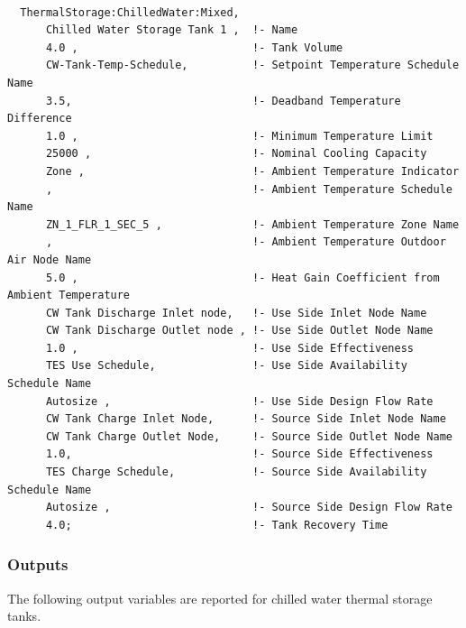 \begin{lstlisting}

  ThermalStorage:ChilledWater:Mixed,
      Chilled Water Storage Tank 1 ,  !- Name
      4.0 ,                           !- Tank Volume
      CW-Tank-Temp-Schedule,          !- Setpoint Temperature Schedule Name
      3.5,                            !- Deadband Temperature Difference
      1.0 ,                           !- Minimum Temperature Limit
      25000 ,                         !- Nominal Cooling Capacity
      Zone ,                          !- Ambient Temperature Indicator
      ,                               !- Ambient Temperature Schedule Name
      ZN_1_FLR_1_SEC_5 ,              !- Ambient Temperature Zone Name
      ,                               !- Ambient Temperature Outdoor Air Node Name
      5.0 ,                           !- Heat Gain Coefficient from Ambient Temperature
      CW Tank Discharge Inlet node,   !- Use Side Inlet Node Name
      CW Tank Discharge Outlet node , !- Use Side Outlet Node Name
      1.0 ,                           !- Use Side Effectiveness
      TES Use Schedule,               !- Use Side Availability Schedule Name
      Autosize ,                      !- Use Side Design Flow Rate
      CW Tank Charge Inlet Node,      !- Source Side Inlet Node Name
      CW Tank Charge Outlet Node,     !- Source Side Outlet Node Name
      1.0,                            !- Source Side Effectiveness
      TES Charge Schedule,            !- Source Side Availability Schedule Name
      Autosize ,                      !- Source Side Design Flow Rate
      4.0;                            !- Tank Recovery Time
\end{lstlisting}

\subsubsection{Outputs}\label{outputs-20-000}

The following output variables are reported for chilled water thermal storage tanks.

